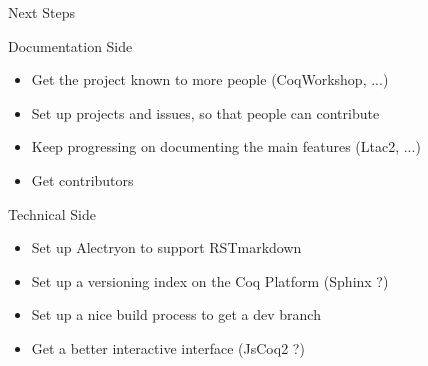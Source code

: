 \documentclass[10pt]{beamer}
\begin{document}
\begin{frame}{Next Steps}
  \begin{tcbObj}{Documentation Side}
    \begin{itemize}[label=$-$]
      \item Get the project known to more people (CoqWorkshop, ...)
      \item Set up projects and issues, so that people can contribute
      \item Keep progressing on documenting the main features (Ltac2, ...)
      \item Get contributors
    \end{itemize}
  \end{tcbObj}
  \begin{tcbObj}{Technical Side}
    \begin{itemize}[label=$-$]
      \item Set up Alectryon to support RSTmarkdown
      \item Set up a versioning index on the Coq Platform (Sphinx ?)
      \item Set up a nice build process to get a dev branch
      \item Get a better interactive interface (JsCoq2 ?)
    \end{itemize}
  \end{tcbObj}
\end{frame}
\end{document}
